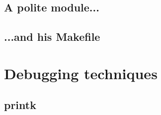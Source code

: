 \documentclass{beamer}
\begin{document}
\subsection{A polite module...}

\subsection{...and his Makefile}

\section{Debugging techniques}
\subsection{printk}

\end{document}
